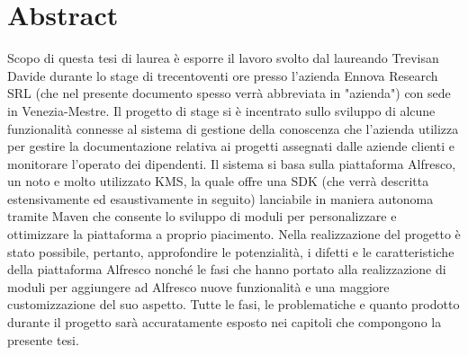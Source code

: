 
\cleardoublepage
{}
{}
\begingroup
\let\clearpage\relax
\let\cleardoublepage\relax
\let\cleardoublepage\relax

\chapter*{Abstract}

Scopo di questa tesi di laurea è esporre il lavoro svolto dal laureando Trevisan Davide
durante lo stage di trecentoventi ore presso l’azienda Ennova Research SRL (che nel presente documento spesso verrà abbreviata in "azienda") con sede in
Venezia-Mestre.
Il progetto di stage si è incentrato sullo sviluppo di alcune funzionalità connesse
al sistema di gestione della conoscenza che l’azienda utilizza per gestire la documentazione relativa ai progetti assegnati dalle aziende clienti e monitorare l’operato dei dipendenti. Il sistema si basa sulla piattaforma Alfresco, un noto e molto utilizzato \gls{KMS}, la quale offre una SDK (che verrà descritta estensivamente ed esaustivamente in seguito) lanciabile in maniera autonoma tramite Maven che consente lo sviluppo di moduli per personalizzare e ottimizzare la piattaforma a proprio piacimento. Nella realizzazione del progetto è stato possibile, pertanto, approfondire le potenzialità, i difetti e le caratteristiche della piattaforma Alfresco nonché le fasi che hanno portato alla realizzazione di moduli per aggiungere ad Alfresco nuove funzionalità e una maggiore customizzazione del suo aspetto.
Tutte le fasi, le problematiche e quanto prodotto durante il progetto sarà accuratamente esposto nei capitoli che compongono la presente tesi.
%
%

\endgroup			

\vfill

